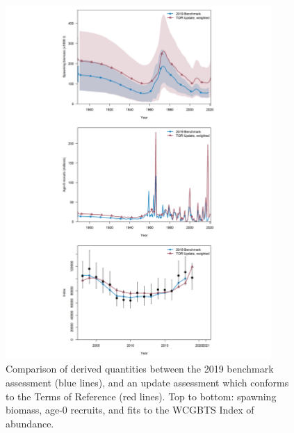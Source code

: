 \documentclass[11pt,
  english,
  a4paper,
]{article}
\begin{document}
\tagmcend\tagstructend


\begin{figure}
\centering
\includegraphics[width=0.9\textwidth,height=0.9\textheight]{figs/tora_panel.png}
\caption{Comparison of derived quantities between the 2019 benchmark assessment (blue lines), and an update assessment which conforms to the Terms of Reference (red lines). Top to bottom: spawning biomass, age-0 recruits, and fits to the WCGBTS Index of abundance. \label{fig:torapanel}}
\end{figure}

\tagmcend\tagstructend

\end{document}
